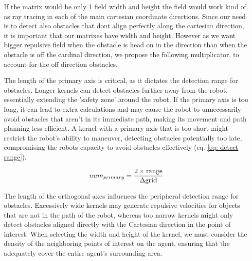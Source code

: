 \documentclass[letterpaper, 10 pt, conference]{ieeeconf}  %
\begin{document}

If the matrix would be only 1 field width and height the field would work kind of as ray tracing in each of the main cartesian coordinate directions. Since our need is to detect also obstacles that dont align perfectly along the cartesian direction, it is important that our matrixes have width and height. However as we want bigger repulsive field when the obstacle is head on in the direction than when the obstacle is off the cardinal direction, we propose the following multiplicator, to account for the off direction obstacles.




The length of the primary axis is critical, as it dictates the detection range for obstacles. Longer kernels can detect obstacles further away
from the robot, essentially extending the ’safety zone’ around the robot. If the primary axis is too long, it can lead to extra calculations and may cause the robot to unnecessarily avoid obstacles that aren't in its immediate path, making its movement and path planning less efficient. A kernel with a primary axis that is too short might restrict the robot's ability to maneuver, detecting obstacles potentially too late, compromising the robots capacity to avoid obstacles effectively (eq. \ref{eq: detect range}). 

\begin{equation}
	\label{eq: detect range}
	num_{primary} = \frac{2 \times \mathrm{range}}{\Delta \mathrm{grid}}\\
\end{equation}



The length of the orthogonal axes influences the peripheral detection range for obstacles. Excessively wide kernels may generate repulsive velocities for objects that are not in the path of the robot, whereas too narrow kernels might only detect obstacles aligned directly with the Cartesian direction in the point of interest. When selecting the width and height of the kernel, we must consider the density of the neighboring points of interest on the agent, ensuring that the  adequately cover the entire agent's surrounding area. 
\end{document}
